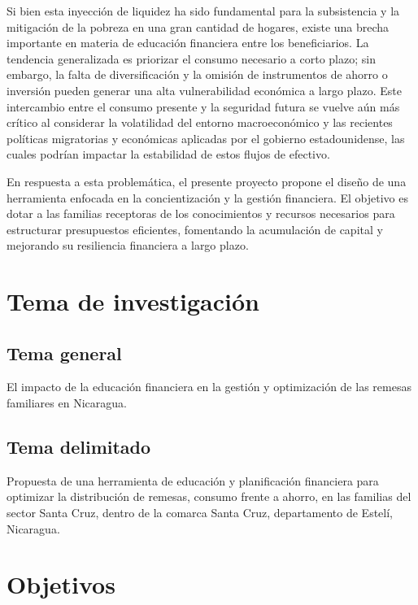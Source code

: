 \documentclass[12pt,letterpaper]{article}
\begin{document}
Si bien esta inyección de liquidez ha sido fundamental para la subsistencia y la mitigación de la pobreza en una gran cantidad de hogares, existe una brecha importante en materia de educación financiera entre los beneficiarios. La tendencia generalizada es priorizar el consumo necesario a corto plazo; sin embargo, la falta de diversificación y la omisión de instrumentos de ahorro o inversión pueden generar una alta vulnerabilidad económica a largo plazo. Este intercambio entre el consumo presente y la seguridad futura se vuelve aún más crítico al considerar la volatilidad del entorno macroeconómico y las recientes políticas migratorias y económicas aplicadas por el gobierno estadounidense, las cuales podrían impactar la estabilidad de estos flujos de efectivo.

En respuesta a esta problemática, el presente proyecto propone el diseño de una herramienta enfocada en la concientización y la gestión financiera. El objetivo es dotar a las familias receptoras de los conocimientos y recursos necesarios para estructurar presupuestos eficientes, fomentando la acumulación de capital y mejorando su resiliencia financiera a largo plazo.

\newpage
\section{\texorpdfstring{\textbf{Tema de investigación}}{Tema de investigación}}\label{tema-de-investigaciuxf3n}

\subsection{\texorpdfstring{\textbf{Tema general}}{Tema general}}\label{tema-general}

El impacto de la educación financiera en la gestión y optimización de las remesas familiares en Nicaragua.

\subsection{\texorpdfstring{\textbf{Tema delimitado}}{Tema delimitado}}\label{tema-delimitado}

Propuesta de una herramienta de educación y planificación financiera para optimizar la distribución de remesas, consumo frente a ahorro, en las familias del sector Santa Cruz, dentro de la comarca Santa Cruz, departamento de Estelí, Nicaragua.

\newpage
\section{\texorpdfstring{\textbf{Objetivos}}{Objetivos}}\label{objetivos}
\end{document}
